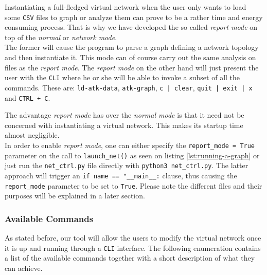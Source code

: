                 Instantiating a full-fledged virtual network when the user only wants to load some \texttt{CSV} files to graph or analyze them can prove to be a rather time and energy consuming process. That is why we have developed the so called \textit{report mode} on top of the \textit{normal} or \textit{network mode}.\\

                The former will cause the program to parse a graph defining a network topology and then instantiate it. This mode can of course carry out the same analysis on files as the \textit{report mode}. The \textit{report mode} on the other hand will just present the user with the \texttt{CLI} where he or she will be able to invoke a subset of all the commands. These are: \texttt{ld-atk-data}, \texttt{atk-graph}, \texttt{c | clear}, \texttt{quit | exit | x} and \texttt{CTRL + C}.

                The advantage \textit{report mode} has over the \textit{normal mode} is that it need not be concerned with instantiating a virtual network. This makes its startup time almost negligible.\\

                In order to enable \textit{report mode}, one can either specify the \texttt{report\_mode = True} parameter on the call to \texttt{launch\_net()} as seen on listing \ref{lst:running-a-graph} or just run the \texttt{net\_ctrl.py} file directly with \texttt{python3 net\_ctrl.py}. The latter approach will trigger an \texttt{if name == "\_\_main\_\_:} clause, thus causing the \texttt{report\_mode} parameter to be set to \texttt{True}. Please note the different files and their purposes will be explained in a later section.\\

            \subsubsection{Available Commands}
                As stated before, our tool will allow the users to modify the virtual network once it is up and running through a \texttt{CLI} interface. The following enumeration contains a list of the available commands together with a short description of what they can achieve.\\

